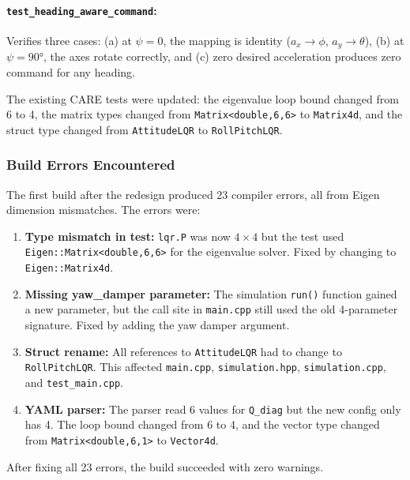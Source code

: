 \documentclass[12pt, a4paper]{article}
\begin{document}
\paragraph{\texttt{test\_heading\_aware\_command}:}  Verifies three cases: (a) at $\psi = 0$, the mapping is identity ($a_x \to \phi$, $a_y \to \theta$), (b) at $\psi = 90°$, the axes rotate correctly, and (c) zero desired acceleration produces zero command for any heading.

The existing CARE tests were updated: the eigenvalue loop bound changed from 6 to 4, the matrix types changed from \texttt{Matrix<double,6,6>} to \texttt{Matrix4d}, and the struct type changed from \texttt{AttitudeLQR} to \texttt{RollPitchLQR}.

\subsubsection{Build Errors Encountered}

The first build after the redesign produced 23 compiler errors, all from Eigen dimension mismatches.  The errors were:

\begin{enumerate}
    \item \textbf{Type mismatch in test:} \texttt{lqr.P} was now $4 \times 4$ but the test used \texttt{Eigen::Matrix<double,6,6>} for the eigenvalue solver.  Fixed by changing to \texttt{Eigen::Matrix4d}.

    \item \textbf{Missing yaw\_damper parameter:} The simulation \texttt{run()} function gained a new parameter, but the call site in \texttt{main.cpp} still used the old 4-parameter signature.  Fixed by adding the yaw damper argument.

    \item \textbf{Struct rename:} All references to \texttt{AttitudeLQR} had to change to \texttt{RollPitchLQR}.  This affected \texttt{main.cpp}, \texttt{simulation.hpp}, \texttt{simulation.cpp}, and \texttt{test\_main.cpp}.

    \item \textbf{YAML parser:}  The parser read 6 values for \texttt{Q\_diag} but the new config only has 4.  The loop bound changed from 6 to 4, and the vector type changed from \texttt{Matrix<double,6,1>} to \texttt{Vector4d}.
\end{enumerate}

After fixing all 23 errors, the build succeeded with zero warnings.
\end{document}
